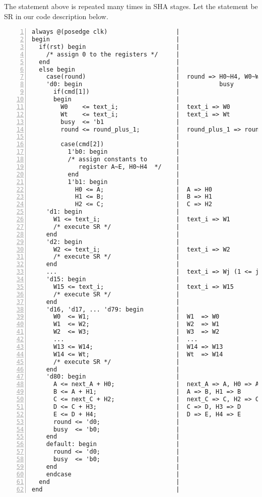 The statement above is repeated many times in SHA stages. 
Let the statement be SR in our code description below.

\begin{Verbatim}[frame=single, numbers=left, tabsize=4, label=SHA stages]
always @(posedge clk)                   |
begin                                   |
  if(rst) begin                         |
    /* assign 0 to the registers */     |
  end                                   |
  else begin                            |
    case(round)                         |  round => H0~H4, W0~W14, Wt, A~E,
    'd0: begin                          |           busy
      if(cmd[1])                        |
      begin                             |
        W0    <= text_i;                |  text_i => W0
        Wt    <= text_i;                |  text_i => Wt
        busy  <= 'b1                    |  
        round <= round_plus_1;          |  round_plus_1 => round
                                        |
        case(cmd[2])                    |
          1'b0: begin                   |
          /* assign constants to        |
             register A~E, H0~H4  */    |
          end                           |
          1'b1: begin                   |
            H0 <= A;                    |  A => H0
            H1 <= B;                    |  B => H1
            H2 <= C;                    |  C => H2
    'd1: begin                          |
      W1 <= text_i;                     |  text_i => W1  
      /* execute SR */                  |  
    end                                 |
    'd2: begin                          |
      W2 <= text_i;                     |  text_i => W2
      /* execute SR */                  |
    end                                 |
	...                                 |  text_i => Wj (1 <= j < 16)
    'd15: begin                         |
      W15 <= text_i;                    |  text_i => W15
      /* execute SR */                  |
    end                                 |
    'd16, 'd17, ... 'd79: begin         |
	  W0  <= W1;                        |  W1  => W0
      W1  <= W2;                        |  W2  => W1
      W2  <= W3;                        |  W3  => W2
      ...                               |  ...
      W13 <= W14;                       |  W14 => W13
      W14 <= Wt;                        |  Wt  => W14
      /* execute SR */                  |
    end                                 |
    'd80: begin                         |
      A <= next_A + H0;                 |  next_A => A, H0 => A
	  B <= A + H1;                      |  A => B, H1 => B
	  C <= next_C + H2;                 |  next_C => C, H2 => C
	  D <= C + H3;                      |  C => D, H3 => D
	  E <= D + H4;                      |  D => E, H4 => E
	  round <= 'd0;                     |
	  busy  <= 'b0;                     |
    end                                 |
    default: begin                      |
      round <= 'd0;                     |
	  busy  <= 'b0;                     |
    end                                 |
    endcase                             |
  end                                   |
end                                     |
\end{Verbatim}

